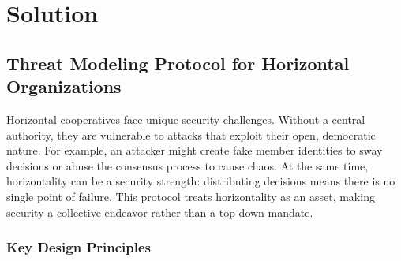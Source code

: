
%

\chapter{Solution}
\label{cha:solution}


\glsresetall
 
\section{Threat Modeling Protocol for Horizontal Organizations}
\label{sec:protocol}

Horizontal cooperatives face unique security challenges. Without a central
authority, they are vulnerable to attacks that exploit their open, democratic
nature. For example, an attacker might create fake member identities to sway
decisions or abuse the consensus process to cause chaos. At the
same time, horizontality can be a security strength: distributing decisions
means there is no single point of failure. This protocol treats horizontality
as an asset, making security a collective endeavor rather than a top-down
mandate.

\subsection{Key Design Principles}
\label{subsec:key_principles}

